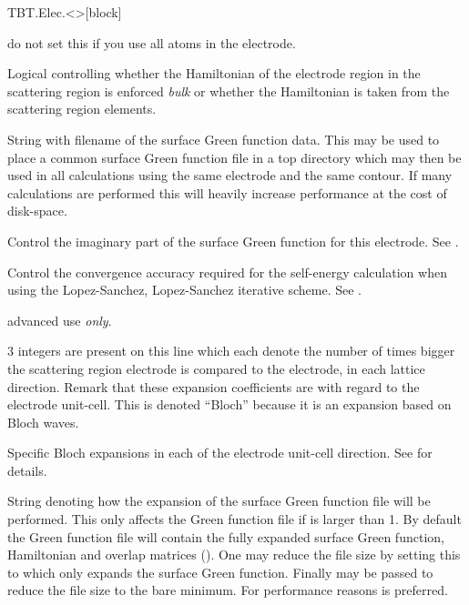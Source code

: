 \begin{fdfentry}{TBT.Elec.<>}[block]
\begin{fdfoptions}
    \note do not set this if you use all atoms in the electrode.

    \option[Bulk]%
    Logical controlling whether the Hamiltonian of the electrode
    region in the scattering region is enforced \emph{bulk} or whether
    the Hamiltonian is taken from the scattering region elements.

    \option[tbt.Gf/Gf]%
    String with filename of the surface Green function data. This may
    be used to place a common surface Green function file in a top
    directory which may then be used in all calculations using the
    same electrode and the same contour. 
    If many calculations are performed this will heavily increase
    performance at the cost of disk-space.

    
    Control the imaginary part of the surface Green function for this
    electrode. See .

    Control the convergence accuracy required for the self-energy
    calculation when using the Lopez-Sanchez, Lopez-Sanchez iterative
    scheme.
    See .

    \note advanced use \emph{only}.

    \option[Bloch]%
    $3$ integers are present on this line which each denote the number
    of times bigger the scattering region electrode is compared to the
    electrode, in each lattice direction. Remark that these expansion
    coefficients are with regard to the electrode unit-cell.
    This is denoted ``Bloch'' because it is an expansion based on
    Bloch waves.

    \option[Bloch-A/a1|B/a2|C/a3]%
    Specific Bloch expansions in each of the electrode unit-cell
    direction. See  for details.

    String denoting how the expansion of the surface Green function
    file will be performed. This only affects the Green function file
    if  is larger than 1. By default the Green function
    file will contain the fully expanded surface Green function,
    Hamiltonian and overlap matrices (). One may reduce the
    file size by setting this to  which only expands the
    surface Green function. Finally  may be passed to
    reduce the file size to the bare minimum. 
    For performance reasons  is preferred. 


\end{fdfoptions}
\end{fdfentry}
